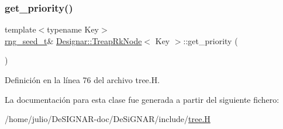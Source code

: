 \subsubsection{\texorpdfstring{get\+\_\+priority()}{get\_priority()}}
{\footnotesize\ttfamily template$<$typename Key$>$ \\
\hyperlink{namespace_designar_ad621b5646d45288c5d6a1e1dfe7531a8}{rng\+\_\+seed\+\_\+t}\& \hyperlink{class_designar_1_1_treap_rk_node}{Designar\+::\+Treap\+Rk\+Node}$<$ Key $>$\+::get\+\_\+priority (\begin{DoxyParamCaption}{ }\end{DoxyParamCaption})\hspace{0.3cm}{\ttfamily [inline]}}



Definición en la línea 76 del archivo tree.\+H.



La documentación para esta clase fue generada a partir del siguiente fichero\+:\begin{DoxyCompactItemize}
\item 
/home/julio/\+De\+S\+I\+G\+N\+A\+R-\/doc/\+De\+Si\+G\+N\+A\+R/include/\hyperlink{tree_8_h}{tree.\+H}\end{DoxyCompactItemize}
